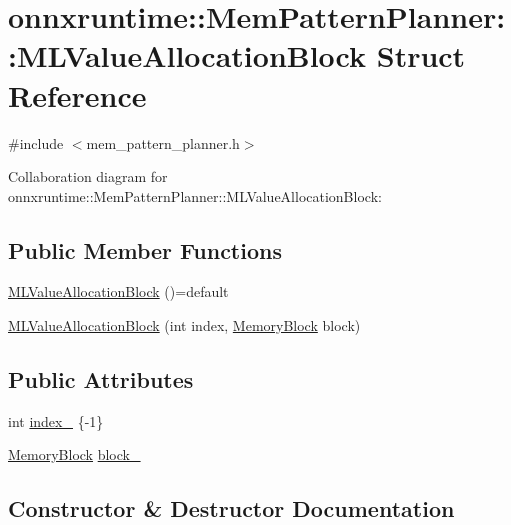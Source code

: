 \hypertarget{structonnxruntime_1_1MemPatternPlanner_1_1MLValueAllocationBlock}{}\section{onnxruntime\+:\+:Mem\+Pattern\+Planner\+:\+:M\+L\+Value\+Allocation\+Block Struct Reference}
\label{structonnxruntime_1_1MemPatternPlanner_1_1MLValueAllocationBlock}


{\ttfamily \#include $<$mem\+\_\+pattern\+\_\+planner.\+h$>$}



Collaboration diagram for onnxruntime\+:\+:Mem\+Pattern\+Planner\+:\+:M\+L\+Value\+Allocation\+Block\+:
\subsection*{Public Member Functions}
\begin{DoxyCompactItemize}
\item 
\mbox{\hyperlink{structonnxruntime_1_1MemPatternPlanner_1_1MLValueAllocationBlock_a17095090b470a8a1a4dd05d6d148546c}{M\+L\+Value\+Allocation\+Block}} ()=default
\item 
\mbox{\hyperlink{structonnxruntime_1_1MemPatternPlanner_1_1MLValueAllocationBlock_aaf5ea7e28ed79110ad097839800d8621}{M\+L\+Value\+Allocation\+Block}} (int index, \mbox{\hyperlink{structonnxruntime_1_1MemoryBlock}{Memory\+Block}} block)
\end{DoxyCompactItemize}
\subsection*{Public Attributes}
\begin{DoxyCompactItemize}
\item 
int \mbox{\hyperlink{structonnxruntime_1_1MemPatternPlanner_1_1MLValueAllocationBlock_a4078a06f008df353c8bff3b146ff3fe7}{index\+\_\+}} \{-\/1\}
\item 
\mbox{\hyperlink{structonnxruntime_1_1MemoryBlock}{Memory\+Block}} \mbox{\hyperlink{structonnxruntime_1_1MemPatternPlanner_1_1MLValueAllocationBlock_aad93381fbc7c02c93606143e05e435d8}{block\+\_\+}}
\end{DoxyCompactItemize}


\subsection{Constructor \& Destructor Documentation}
\mbox{\label{structonnxruntime_1_1MemPatternPlanner_1_1MLValueAllocationBlock_a17095090b470a8a1a4dd05d6d148546c}} 
